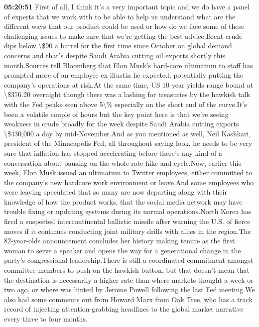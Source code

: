 \documentclass{article}%
\begin{document}
\textbf{05:20:51}%
\newline%
First of all, I think it's a very important topic and we do have a panel of experts that we work with to be able to help us understand what are the different ways that our product could be used or how do we face some of these challenging issues to make sure that we're getting the best advice.Brent crude dips below \textbackslash{}\$90 a barrel for the first time since October on global demand concerns and that's despite Saudi Arabia cutting oil exports shortly this month.Sources tell Bloomberg that Elon Musk's hard{-}core ultimatum to staff has prompted more of an employee ex{-}illustin he expected, potentially putting the company's operations at risk.At the same time, US 10 year yields range bound at \textbackslash{}\$376.20 overnight though there was a lashing for treasuries by the hawkish talk with the Fed peaks seen above 5\textbackslash{}\% especially on the short end of the curve.It's been a volatile couple of hours but the key point here is that we're seeing weakness in crude broadly for the week despite Saudi Arabia cutting exports \textbackslash{}\$430,000 a day by mid{-}November.And as you mentioned as well, Neil Kashkari, president of the Minneapolis Fed, all throughout saying look, he needs to be very sure that inflation has stopped accelerating before there's any kind of a conversation about pausing on the whole rate hike and cycle.Now, earlier this week, Elon Musk issued an ultimatum to Twitter employees, either committed to the company's new hardcore work environment or leave.And some employees who were leaving speculated that so many are now departing along with their knowledge of how the product works, that the social media network may have trouble fixing or updating systems during its normal operations.North Korea has fired a suspected intercontinental ballistic missile after warning the U.S. of fierce moves if it continues conducting joint military drills with allies in the region.The 82{-}year{-}olds announcement concludes her history making tenure as the first woman to serve a speaker and opens the way for a generational change in the party's congressional leadership.There is still a coordinated commitment amongst committee members to push on the hawkish button, but that doesn't mean that the destination is necessarily a higher rate than where markets thought a week or two ago, or where was hinted by Jerome Powell following the last Fed meeting.We also had some comments out from Howard Marx from Oak Tree, who has a track record of injecting attention{-}grabbing headlines to the global market narrative every three to four months.%
\end{document}
